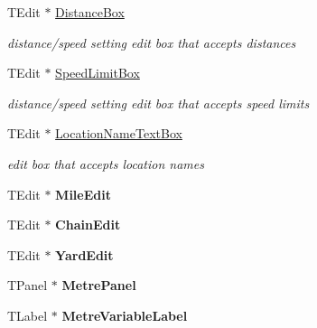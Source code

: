 \begin{DoxyCompactItemize}
\mbox{\label{class_t_interface_ad11eb967bcb0710eef4bf8874cc55da5}} 
T\+Edit $\ast$ \mbox{\hyperlink{class_t_interface_ad11eb967bcb0710eef4bf8874cc55da5}{Distance\+Box}}
\begin{DoxyCompactList}\small\item\em distance/speed setting edit box that accepts distances \end{DoxyCompactList}\item 
\mbox{\label{class_t_interface_a2059da7bcb6b1701ba079688506bc553}} 
T\+Edit $\ast$ \mbox{\hyperlink{class_t_interface_a2059da7bcb6b1701ba079688506bc553}{Speed\+Limit\+Box}}
\begin{DoxyCompactList}\small\item\em distance/speed setting edit box that accepts speed limits \end{DoxyCompactList}\item 
\mbox{\label{class_t_interface_ad3962abdc8182594946076e502fe5ca9}} 
T\+Edit $\ast$ \mbox{\hyperlink{class_t_interface_ad3962abdc8182594946076e502fe5ca9}{Location\+Name\+Text\+Box}}
\begin{DoxyCompactList}\small\item\em edit box that accepts location names \end{DoxyCompactList}\item 
\mbox{\label{class_t_interface_aafe52bbdfbb7282c54bc74eeb00ef023}} 
T\+Edit $\ast$ {\bfseries Mile\+Edit}
\item 
\mbox{\label{class_t_interface_ad65abd81976ab8ecae89486874d45576}} 
T\+Edit $\ast$ {\bfseries Chain\+Edit}
\item 
\mbox{\label{class_t_interface_af202a63fcf543e81c3e3523899992d17}} 
T\+Edit $\ast$ {\bfseries Yard\+Edit}
\item 
\mbox{\label{class_t_interface_ad19971b9ecb8a4dca5ca99935b79c18e}} 
T\+Panel $\ast$ {\bfseries Metre\+Panel}
\item 
\mbox{\label{class_t_interface_a6b0d75ecb3c010cbe2ae1a7872fa70b3}} 
T\+Label $\ast$ {\bfseries Metre\+Variable\+Label}

\end{DoxyCompactItemize}
